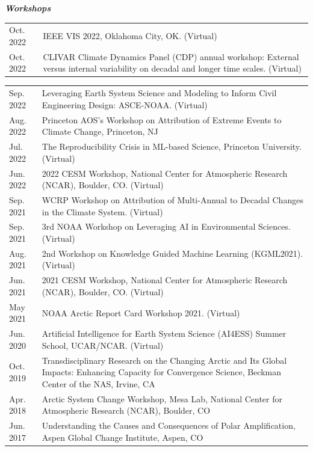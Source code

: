 \documentclass[margin,line,palatino,courier,10pt]{res}
\begin{document}
\begin{resume}
\textit{\textbf{Workshops}}
\vspace*{0.05in}\\
\begin{tabular}{@{}p{0.9in}p{4in}}
Oct. 2022 & IEEE VIS 2022, Oklahoma City, OK. (Virtual)\\
Oct. 2022 & CLIVAR Climate Dynamics Panel (CDP) annual workshop: External versus internal variability on decadal and longer time scales. (Virtual)\\
\end{tabular}
\begin{tabular}{@{}p{0.9in}p{4in}}
Sep. 2022 & Leveraging Earth System Science and Modeling to Inform Civil Engineering Design: ASCE-NOAA. (Virtual)\\
Aug. 2022 & Princeton AOS's Workshop on Attribution of Extreme Events to Climate Change, Princeton, NJ\\
Jul. 2022 & The Reproducibility Crisis in ML-based Science, Princeton University. (Virtual)\\
Jun. 2022 & 2022 CESM Workshop, National Center for Atmospheric Research (NCAR), Boulder, CO. (Virtual)\\
Sep. 2021 & WCRP Workshop on Attribution of Multi-Annual to Decadal Changes in the Climate System. (Virtual)\\
Sep. 2021 & 3rd NOAA Workshop on Leveraging AI in Environmental Sciences. (Virtual)\\
Aug. 2021 & 2nd Workshop on Knowledge Guided Machine Learning (KGML2021). (Virtual)\\
Jun. 2021 & 2021 CESM Workshop, National Center for Atmospheric Research (NCAR), Boulder, CO. (Virtual)\\
May 2021 & NOAA Arctic Report Card Workshop 2021. (Virtual)\\
Jun. 2020 & Artificial Intelligence for Earth System Science (AI4ESS) Summer School, UCAR/NCAR. (Virtual)\\
Oct. 2019 & Transdisciplinary Research on the Changing Arctic and Its Global Impacts:  Enhancing Capacity for Convergence Science, Beckman Center of the NAS, Irvine, CA\\
Apr. 2018 & Arctic System Change Workshop, Mesa Lab, National Center for Atmospheric Research (NCAR), Boulder, CO\\
Jun. 2017 & Understanding the Causes and Consequences of Polar Amplification, Aspen Global Change Institute, Aspen, CO
\end{tabular}

\vspace{-0.1in}
\noindent\textcolor{Cerulean}{\makebox[\linewidth][r]{\rule{\textwidth}{5pt}}}
\vspace{-0.3in}

\end{resume}
\end{document}
